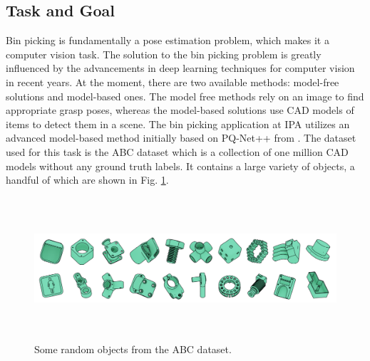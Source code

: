 \subsection{Task and Goal}
Bin picking is fundamentally a pose estimation problem, which makes it a computer vision task. The solution to the bin picking problem is greatly influenced by the advancements in deep learning techniques for computer vision in recent years. At the moment, there are two available methods: model-free solutions and model-based ones. The model free methods rely on an image to find appropriate grasp poses, whereas the model-based solutions use \ac{CAD} models of items to detect them in a scene\cite{spenrath2022heuristic}. The bin picking application at \ac{IPA} utilizes an advanced model-based method initially based on PQ-Net++ from \cite{kleeberger2021precise}. The dataset used for this task is the ABC dataset\cite{Koch_2019_CVPR} which is a collection of one million \ac{CAD} models without any ground truth labels. It contains a large variety of objects, a handful of which are shown in Fig. \ref{fig:abc}.
\begin{figure}[t]
    \centering
    \includegraphics[width=350pt,height=150pt]{pictures/ABC.PNG}
    \caption{Some random objects from the ABC dataset.\cite{Koch_2019_CVPR}}
    \label{fig:abc}
  \end{figure}
\vspace{5mm}

